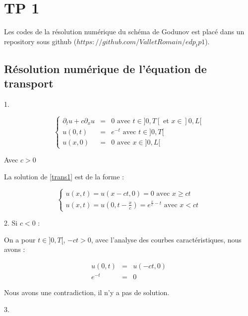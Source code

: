 \documentclass{article}
\begin{document}
\section{TP 1}

Les codes de la résolution numérique du schéma de Godunov est placé dans un repository sous github ($https://github.com/ValletRomain/edp_tp1$).

\subsection{Résolution numérique de l’équation de transport}

1.

\[ \left\{ \begin{matrix}
\partial_t u + c \partial_x u &=& 0 \text{ avec } t \in ]0,T[ \text{ et } x \in ]0,L[  \\
u(0,t) &=& e^{-t} \text{ avec } t \in ]0,T[ \\
u(x,0) &=& 0 \text{ avec } x \in ]0,L[
\end{matrix} \right.
\label{trans1} \tag{Transport1} \]

Avec $c>0$
\newline

La solution de \ref{trans1} est de la forme :

\[
\left\{
\begin{array}{ll}
    u(x,t) = u(x-ct,0) = 0 \text{ avec } x \geq ct \\
    u(x,t) = u(0,t-\frac{x}{c}) = e^{\frac{x}{c}-t} \text{ avec } x < ct
\end{array}
\right.
\tag{Sol1}
\]

2. Si $c < 0$ :

On a pour $t \in ]0,T[$, $-ct>0$, avec l'analyse des courbes caractéristiques, nous avons :

\begin{eqnarray*}
u(0,t) &=& u(-ct,0) \\
e^{-t} &=& 0
\end{eqnarray*}

Nous avons une contradiction, il n'y a pas de solution.
\newline

3.
\end{document}
